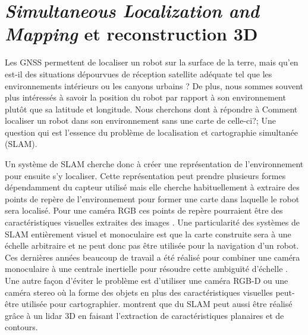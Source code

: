 \section{\textit{Simultaneous Localization and Mapping} et reconstruction 3D}\label{subsec:reconstruction}

Les GNSS permettent de localiser un robot sur la surface de la terre, mais qu'en est-il des situations dépourvues de réception satellite adéquate tel que les environnements intérieurs ou les \guillemotleft canyons urbains \guillemotright ? De plus, nous sommes souvent plus intéressés à savoir la position du robot par rapport à son environnement plutôt que sa latitude et longitude. Nous cherchons dont à répondre à \guillemotleft Comment localiser un robot dans son environnement sans une carte de celle-ci?\guillemotright; Une question qui est l'essence du problème de localisation et cartographie simultanée (SLAM).

Un système de SLAM cherche donc à créer une représentation de l'environnement pour ensuite s'y localiser. Cette représentation peut prendre plusieurs formes dépendamment du capteur utilisé mais elle cherche habituellement à extraire des points de repère de l'environnement pour former une carte dans laquelle le robot sera localisé. Pour une caméra RGB ces points de repère pourraient être des caractéristiques visuelles extraites des images \citep{Mur-Artal2017}. Une particularité des systèmes de SLAM entièrement visuel et monoculaire est que la carte construite sera à une échelle arbitraire et ne peut donc pas être utilisée pour la navigation d'un robot. Ces dernières années beaucoup de travail a été réalisé pour combiner une caméra monoculaire à une centrale inertielle pour résoudre cette ambiguïté d'échelle \citep{muratal2017vimonoslam}. Une autre façon d'éviter le problème est d'utiliser une caméra RGB-D ou une caméra stereo où la forme des objets en plus des caractéristiques visuelles peut-être utilisée \citep{henry2014rgb} pour cartographier. \cite{Zhang2017} montrent que du SLAM peut aussi être réalisé grâce à un lidar 3D en faisant l'extraction de caractéristiques planaires et de contours.

